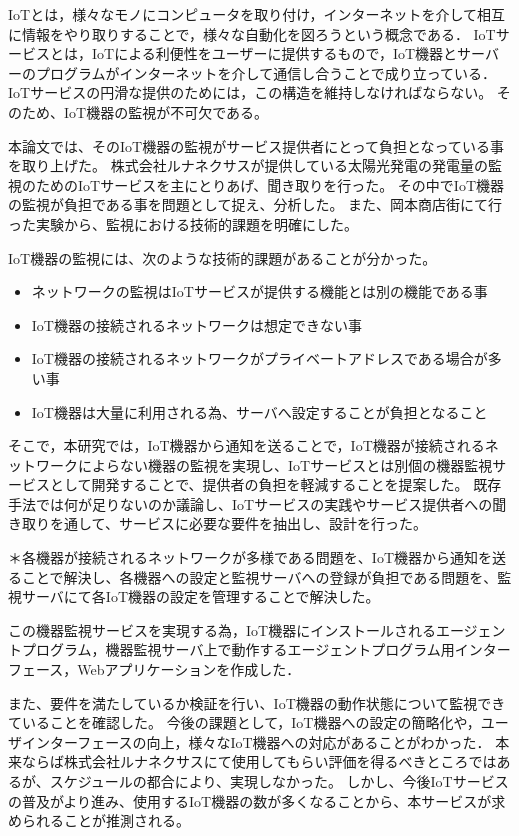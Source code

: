IoTとは，様々なモノにコンピュータを取り付け，インターネットを介して相互に情報をやり取りすることで，様々な自動化を図ろうという概念である．
IoTサービスとは，IoTによる利便性をユーザーに提供するもので，IoT機器とサーバーのプログラムがインターネットを介して通信し合うことで成り立っている．
IoTサービスの円滑な提供のためには，この構造を維持しなければならない。
そのため、IoT機器の監視が不可欠である。
\medskip

本論文では、そのIoT機器の監視がサービス提供者にとって負担となっている事を取り上げた。
株式会社ルナネクサスが提供している太陽光発電の発電量の監視のためのIoTサービスを主にとりあげ、聞き取りを行った。
その中でIoT機器の監視が負担である事を問題として捉え、分析した。
また、岡本商店街にて行った実験から、監視における技術的課題を明確にした。

IoT機器の監視には、次のような技術的課題があることが分かった。
\begin{itemize}
\item ネットワークの監視はIoTサービスが提供する機能とは別の機能である事
\item IoT機器の接続されるネットワークは想定できない事
\item IoT機器の接続されるネットワークがプライベートアドレスである場合が多い事
\item IoT機器は大量に利用される為、サーバへ設定することが負担となること
\end{itemize}
\medskip

そこで，本研究では，IoT機器から通知を送ることで，IoT機器が接続されるネットワークによらない機器の監視を実現し、IoTサービスとは別個の機器監視サービスとして開発することで、提供者の負担を軽減することを提案した。
既存手法では何が足りないのか議論し、IoTサービスの実践やサービス提供者への聞き取りを通して、サービスに必要な要件を抽出し、設計を行った。

＊各機器が接続されるネットワークが多様である問題を、IoT機器から通知を送ることで解決し、各機器への設定と監視サーバへの登録が負担である問題を、監視サーバにて各IoT機器の設定を管理することで解決した。

この機器監視サービスを実現する為，IoT機器にインストールされるエージェントプログラム，機器監視サーバ上で動作するエージェントプログラム用インターフェース，Webアプリケーションを作成した．
\medskip

また、要件を満たしているか検証を行い、IoT機器の動作状態について監視できていることを確認した。
今後の課題として，IoT機器への設定の簡略化や，ユーザインターフェースの向上，様々なIoT機器への対応があることがわかった．
本来ならば株式会社ルナネクサスにて使用してもらい評価を得るべきところではあるが、スケジュールの都合により、実現しなかった。
しかし、今後IoTサービスの普及がより進み、使用するIoT機器の数が多くなることから、本サービスが求められることが推測される。

